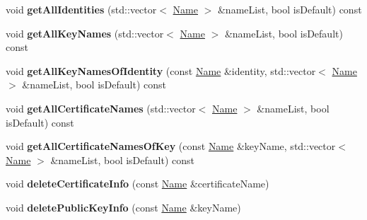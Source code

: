 \begin{DoxyCompactItemize}
\item 
void {\bfseries get\+All\+Identities} (std\+::vector$<$ \hyperlink{classndn_1_1Name}{Name} $>$ \&name\+List, bool is\+Default) const\hypertarget{classndn_1_1security_1_1KeyChain_a45481c49f262bda78863a86655deffc0}{}\label{classndn_1_1security_1_1KeyChain_a45481c49f262bda78863a86655deffc0}

\item 
void {\bfseries get\+All\+Key\+Names} (std\+::vector$<$ \hyperlink{classndn_1_1Name}{Name} $>$ \&name\+List, bool is\+Default) const\hypertarget{classndn_1_1security_1_1KeyChain_ac93f59296e46c73751d33ea140401ce6}{}\label{classndn_1_1security_1_1KeyChain_ac93f59296e46c73751d33ea140401ce6}

\item 
void {\bfseries get\+All\+Key\+Names\+Of\+Identity} (const \hyperlink{classndn_1_1Name}{Name} \&identity, std\+::vector$<$ \hyperlink{classndn_1_1Name}{Name} $>$ \&name\+List, bool is\+Default) const\hypertarget{classndn_1_1security_1_1KeyChain_a4b10e7f993f9e1da83bcc222e7456c49}{}\label{classndn_1_1security_1_1KeyChain_a4b10e7f993f9e1da83bcc222e7456c49}

\item 
void {\bfseries get\+All\+Certificate\+Names} (std\+::vector$<$ \hyperlink{classndn_1_1Name}{Name} $>$ \&name\+List, bool is\+Default) const\hypertarget{classndn_1_1security_1_1KeyChain_aeee8c2d3e7427c5963d805e5422e1ec2}{}\label{classndn_1_1security_1_1KeyChain_aeee8c2d3e7427c5963d805e5422e1ec2}

\item 
void {\bfseries get\+All\+Certificate\+Names\+Of\+Key} (const \hyperlink{classndn_1_1Name}{Name} \&key\+Name, std\+::vector$<$ \hyperlink{classndn_1_1Name}{Name} $>$ \&name\+List, bool is\+Default) const\hypertarget{classndn_1_1security_1_1KeyChain_a05ffad31712042991d0f3c1bb3923d1e}{}\label{classndn_1_1security_1_1KeyChain_a05ffad31712042991d0f3c1bb3923d1e}

\item 
void {\bfseries delete\+Certificate\+Info} (const \hyperlink{classndn_1_1Name}{Name} \&certificate\+Name)\hypertarget{classndn_1_1security_1_1KeyChain_a2bffd75409a349e16373de64e4ca1763}{}\label{classndn_1_1security_1_1KeyChain_a2bffd75409a349e16373de64e4ca1763}

\item 
void {\bfseries delete\+Public\+Key\+Info} (const \hyperlink{classndn_1_1Name}{Name} \&key\+Name)\hypertarget{classndn_1_1security_1_1KeyChain_a0ff9379ac1c52aa03736ea619c83c4d1}{}\label{classndn_1_1security_1_1KeyChain_a0ff9379ac1c52aa03736ea619c83c4d1}


\end{DoxyCompactItemize}
